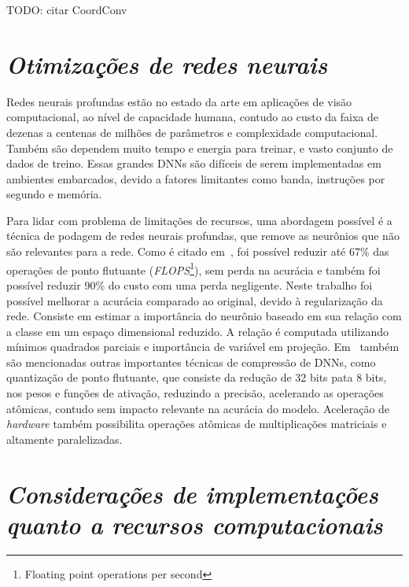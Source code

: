 TODO: citar CoordConv

\section{\textit{Otimizações de redes neurais}}\label{sec:Cap2_compressao}


Redes neurais profundas estão no estado da arte em aplicações de visão computacional, ao nível de capacidade humana, contudo ao custo da faixa de dezenas a centenas de milhões de parâmetros e complexidade computacional. Também são dependem muito tempo e energia para treinar, e vasto conjunto de dados de treino. Essas grandes DNNs são difíceis de serem implementadas em ambientes embarcados, devido a fatores limitantes como banda, instruções por segundo e memória.

Para lidar com problema de limitações de recursos, uma abordagem possível é a técnica de podagem de redes neurais profundas, que remove as neurônios que não são relevantes para a rede. Como é citado em~\cite{jordao2019pruning}, foi possível reduzir até 67\% das operações de ponto flutuante (\textit{FLOPS}\footnote{Floating point operations per second }), sem perda na acurácia e também foi possível reduzir 90\% do custo com uma perda negligente. Neste trabalho foi possível melhorar a acurácia comparado ao original, devido à regularização da rede. Consiste em estimar a importância do neurônio baseado em sua relação com a classe em um espaço dimensional reduzido. A relação é computada utilizando mínimos quadrados parciais e importância de variável em projeção. Em~\cite{liang2021pruning} também são mencionadas outras importantes técnicas de compressão de DNNs, como quantização de ponto flutuante, que consiste da redução de 32 bits pata 8 bits, nos pesos e funções de ativação, reduzindo a precisão, acelerando as operações atômicas, contudo sem impacto relevante na acurácia do modelo. Aceleração de \textit{hardware} também possibilita operações atômicas de multiplicações matriciais e altamente paralelizadas.

\section{\textit{ Considerações de implementações quanto a recursos computacionais}}\label{sec:Cap2_trabalhos}


